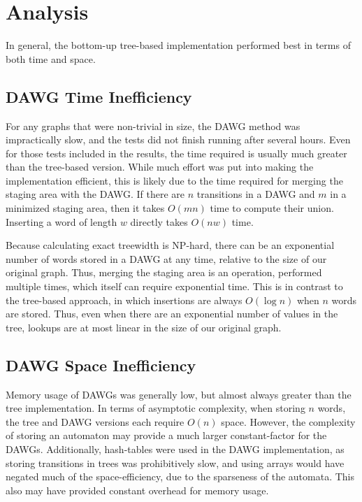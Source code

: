 \documentclass{article}
\begin{document}
\section{Analysis}

In general, the bottom-up tree-based implementation performed best in terms of both time and space.

\subsection{DAWG Time Inefficiency}

For any graphs that were non-trivial in size, the DAWG method was impractically slow,
and the tests did not finish running after several hours.
Even for those tests included in the results, the time required is usually much greater
than the tree-based version.
While much effort was put into making the implementation efficient, this is likely due
to the time required for merging the staging area with the DAWG.
If there are $n$ transitions in a DAWG and $m$ in a minimized staging area, then it takes $O(mn)$
time to compute their union. Inserting a word of length $w$ directly takes $O(nw)$ time.

Because calculating exact treewidth is NP-hard, there can be an exponential number of words
stored in a DAWG at any time, relative to the size of our original graph.
Thus, merging the staging area is an operation, performed multiple times,
which itself can require exponential time. This is in contrast to the tree-based approach, in which
insertions are always $O(\log n)$ when $n$ words are stored. Thus, even when there are an exponential number
of values in the tree, lookups are at most linear in the size of our original graph.

\subsection{DAWG Space Inefficiency}

Memory usage of DAWGs was generally low, but almost always greater than the tree implementation.
In terms of asymptotic complexity, when storing $n$ words, the tree and DAWG versions each require $O(n)$ space.
However, the complexity of storing an automaton may provide a much larger constant-factor for the DAWGs.
Additionally, hash-tables were used in the DAWG implementation, as storing transitions in trees was
prohibitively slow, and using arrays would have negated much of the space-efficiency,
due to the sparseness of the automata.
This also may have provided constant overhead for memory usage.
\end{document}
